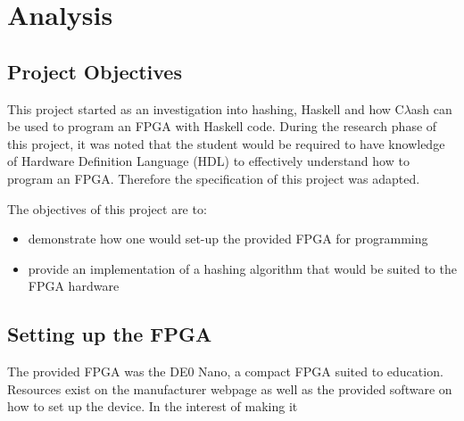 \chapter{Analysis}
\section{Project Objectives}
This project started as an investigation into hashing, Haskell and how C$\lambda$ash can be used to program an FPGA with Haskell code. During the research phase of this project, it was noted that the student would be required to have knowledge of Hardware Definition Language (HDL) to effectively understand how to program an FPGA. Therefore the specification of this project was adapted.

The objectives of this project are to:
\begin{itemize}
	\item demonstrate how one would set-up the provided FPGA for programming
	\item provide an implementation of a hashing algorithm that would be suited to the FPGA hardware
\end{itemize}

\section{Setting up the FPGA }
The provided FPGA was the DE0 Nano\cite{DE0NanoWebpage}, a compact FPGA suited to education. Resources exist on the manufacturer webpage as well as the provided software on how to set up the device. In the interest of making it 